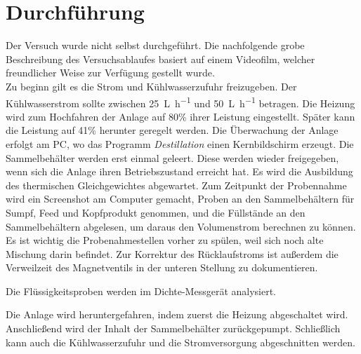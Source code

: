 \section{Durchführung}
\label{sec:durchfuerung}
Der Versuch wurde nicht selbst durchgeführt. Die nachfolgende grobe Beschreibung des Versuchsablaufes basiert auf einem Videofilm, welcher freundlicher Weise zur Verfügung gestellt wurde. \\
Zu beginn gilt es die Strom und Kühlwasserzufuhr freizugeben. Der Kühlwasserstrom sollte zwischen \SI{25}{\liter\per\hour} und \SI{50}{\liter\per\hour} betragen. Die Heizung wird zum Hochfahren der Anlage auf 80\% ihrer Leistung eingestellt. Später kann die Leistung auf 41\% herunter geregelt werden. Die Überwachung der Anlage erfolgt am PC, wo das Programm \emph{Destillation} einen Kernbildschirm erzeugt.
Die Sammelbehälter werden erst einmal geleert. Diese werden wieder freigegeben, wenn sich die Anlage ihren Betriebszustand erreicht hat. Es wird die Ausbildung des thermischen Gleichgewichtes abgewartet. Zum Zeitpunkt der Probennahme wird ein Screenshot am Computer gemacht, Proben an den Sammelbehältern für Sumpf, Feed und Kopfprodukt genommen, und die Füllstände an den Sammelbehältern abgelesen, um daraus den Volumenstrom berechnen zu können. Es ist wichtig die Probenahmestellen vorher zu spülen, weil sich noch alte Mischung darin befindet. Zur Korrektur des Rücklaufstroms ist außerdem die Verweilzeit des Magnetventils in der unteren Stellung zu dokumentieren.

Die Flüssigkeitsproben werden im Dichte-Messgerät analysiert.

Die Anlage wird heruntergefahren, indem zuerst die Heizung abgeschaltet wird. Anschließend wird der Inhalt der Sammelbehälter zurückgepumpt. Schließlich kann auch die Kühlwasserzufuhr und die Stromversorgung abgeschnitten werden.